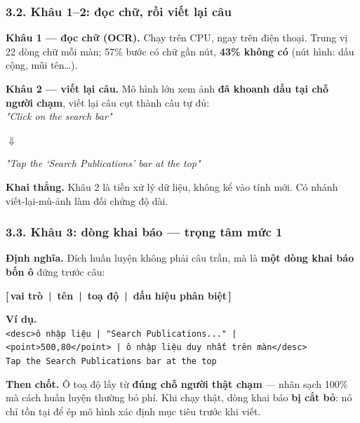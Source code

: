 \documentclass[10pt]{beamer}
\newcommand{\dn}[1]{{\color{dnteal}\textbf{#1}}}
\newcommand{\vd}[1]{{\color{vdblue}\textbf{#1}}}
\newcommand{\chred}[1]{{\color{chapred}\textbf{#1}}}
\newcommand{\ann}[1]{{\color{annmar}\textbf{#1}}}
\newcommand{\nv}[1]{{\color{daunavy}\textbf{#1}}}
\begin{document}
\begin{frame}
  \frametitle{3.2. Khâu 1--2: đọc chữ, rồi viết lại câu}
  \begin{block}{}
    \dn{Khâu 1 --- đọc chữ (OCR).} Chạy trên CPU, ngay trên điện thoại. Trung vị 22 dòng chữ mỗi màn; 57\% bước có chữ gần nút, \ann{43\% không có} (nút hình: dấu cộng, mũi tên\ldots).
  \end{block}
  \begin{block}{}
    \dn{Khâu 2 --- viết lại câu.} Mô hình lớn xem ảnh \nv{đã khoanh dấu tại chỗ người chạm}, viết lại câu cụt thành câu tự đủ:\\[1ex]
    \textit{"Click on the search bar"}\\
    \centerline{$\Downarrow$}
    \textit{"Tap the `Search Publications' bar at the top"}
  \end{block}
  \vspace{0.4ex}
  {\small \ann{Khai thẳng.} Khâu 2 là tiền xử lý dữ liệu, không kể vào tính mới. Có nhánh viết-lại-mù-ảnh làm đối chứng độ dài.}
\end{frame}

\begin{frame}
  \frametitle{3.3. Khâu 3: dòng khai báo --- trọng tâm mức 1}
  \begin{block}{}
    \dn{Định nghĩa.} Đích huấn luyện không phải câu trần, mà là \nv{một dòng khai báo bốn ô} đứng trước câu:\\[1.2ex]
    \centerline{\chred{[\,vai trò\ |\ tên\ |\ toạ độ\ |\ dấu hiệu phân biệt\,]}}
  \end{block}
  \begin{block}{}
    \vd{Ví dụ.}\\[0.6ex]
    {\small\texttt{<desc>ô nhập liệu | "Search Publications..." |}\\
    \texttt{<point>500,80</point> | ô nhập liệu duy nhất trên màn</desc>}\\[0.6ex]
    \texttt{Tap the Search Publications bar at the top}}
  \end{block}
  \vspace{0.6ex}
  \dn{Then chốt.} Ô toạ độ lấy từ \nv{đúng chỗ người thật chạm} --- nhãn sạch 100\% mà cách huấn luyện thường bỏ phí. Khi chạy thật, dòng khai báo \nv{bị cắt bỏ}: nó chỉ tồn tại để ép mô hình xác định mục tiêu trước khi viết.
\end{frame}
\end{document}
